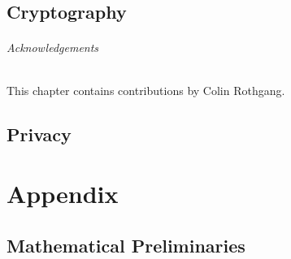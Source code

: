 \documentclass{book}
\begin{document}
  \chapter{Cryptography}

  \paragraph{Acknowledgements}
  This chapter contains contributions by Colin Rothgang.
  
    


  \chapter{Privacy}

%
%  

\part{Appendix}

\appendix

\chapter{Mathematical Preliminaries}\label{sec:math}


\tocentryBib


%
%
\end{document}
